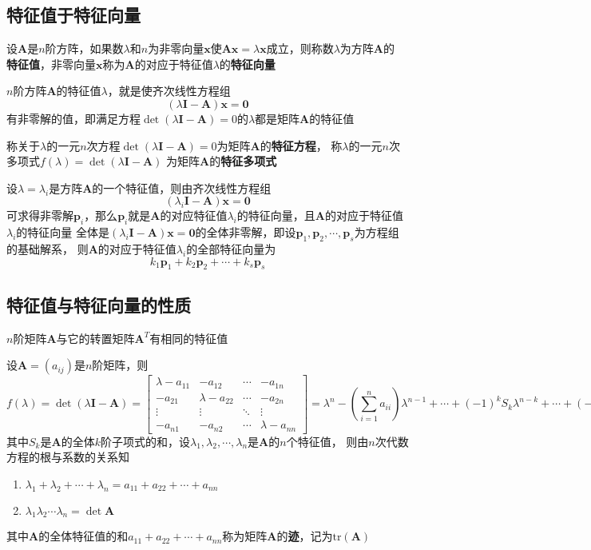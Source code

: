 \documentclass[UTF8]{ctexart}
\newcommand{\ve}[1]{{\bm{#1}}}
\newcommand{\mat}[1]{\ve{#1}}
\begin{document}
\subsection*{特征值于特征向量}

设$\mat{A}$是$n$阶方阵，如果数$\lambda$和$n$为非零向量$\mat{x}$使$\mat{A}\mat{x}=\lambda\mat{x}$成立，则称数$\lambda$为方阵$\mat{A}$的
\textbf{特征值}，非零向量$\mat{x}$称为$\mat{A}$的对应于特征值$\lambda$的\textbf{特征向量}

$n$阶方阵$\mat{A}$的特征值$\lambda$，就是使齐次线性方程组
\[(\lambda\mat{I}-\mat{A})\mat{x}=\mat{0}\]
有非零解的值，即满足方程$\det(\lambda\mat{I}-\mat{A})=0$的$\lambda$都是矩阵$\mat{A}$的特征值

称关于$\lambda$的一元$n$次方程$\det(\lambda\mat{I}-\mat{A})=0$为矩阵$\mat{A}$的\textbf{特征方程}，
称$\lambda$的一元$n$次多项式$f(\lambda)=\det(\lambda\mat{I}-\mat{A})$
为矩阵$\mat{A}$的\textbf{特征多项式}

设$\lambda=\lambda_i$是方阵$\mat{A}$的一个特征值，则由齐次线性方程组
\[(\lambda_i\mat{I}-\mat{A})\mat{x}=\mat{0}\]
可求得非零解$\mat{p}_i$，那么$\mat{p}_i$就是$\mat{A}$的对应特征值$\lambda_i$的特征向量，且$\mat{A}$的对应于特征值$\lambda_i$的特征向量
全体是$(\lambda_i\mat{I}-\mat{A})\mat{x}=\mat{0}$的全体非零解，即设$\mat{p}_1,\mat{p}_2,\cdots,\mat{p}_s$为方程组的基础解系，
则$\mat{A}$的对应于特征值$\lambda_i$的全部特征向量为
\[k_1\mat{p}_1+k_2\mat{p}_2+\cdots+k_s\mat{p}_s\]

\subsection*{特征值与特征向量的性质}

$n$阶矩阵$\mat{A}$与它的转置矩阵$\mat{A}^T$有相同的特征值

设$\mat{A}=(a_{ij})$是$n$阶矩阵，则
\[f(\lambda)=\det(\lambda\mat{I}-\mat{A})=
\begin{bmatrix}
  \lambda-a_{11}&-a_{12}&\cdots&-a_{1n}\\
  -a_{21}&\lambda-a_{22}&\cdots&-a_{2n}\\
  \vdots&\vdots&\ddots&\vdots\\
  -a_{n1}&-a_{n2}&\cdots&\lambda-a_{nn}
\end{bmatrix}
=\lambda^n-(\sum_{i=1}^na_{ii})\lambda^{n-1}+\cdots+(-1)^kS_k\lambda^{n-k}+\cdots+(-1)^n\det\mat{A}
\]
其中$S_k$是$\mat{A}$的全体$k$阶子项式的和，设$\lambda_1,\lambda_2,\cdots,\lambda_n$是$\mat{A}$的$n$个特征值，
则由$n$次代数方程的根与系数的关系知
\begin{enumerate}
  \item $\lambda_1+\lambda_2+\cdots+\lambda_n=a_{11}+a_{22}+\cdots+a_{nn}$
  \item $\lambda_1\lambda_2\cdots\lambda_n=\det\mat{A}$
\end{enumerate}
其中$\mat{A}$的全体特征值的和$a_{11}+a_{22}+\cdots+a_{nn}$称为矩阵$\mat{A}$的\textbf{迹}，记为$\text{tr}(\mat{A})$
\end{document}
